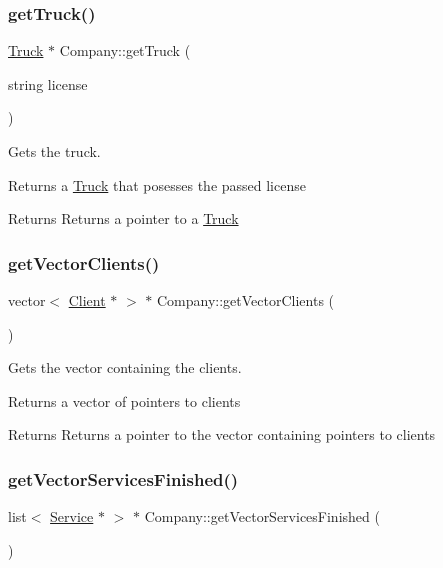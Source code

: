\subsubsection{\texorpdfstring{get\+Truck()}{getTruck()}}
{\footnotesize\ttfamily \hyperlink{class_truck}{Truck} $\ast$ Company\+::get\+Truck (\begin{DoxyParamCaption}\item[{string}]{license }\end{DoxyParamCaption})}



Gets the truck. 

Returns a \hyperlink{class_truck}{Truck} that posesses the passed license

\begin{DoxyReturn}{Returns}
Returns a pointer to a \hyperlink{class_truck}{Truck} 
\end{DoxyReturn}
\mbox{\label{class_company_a16693c2e4bf9a932e15926c37c21485f}} 
\subsubsection{\texorpdfstring{get\+Vector\+Clients()}{getVectorClients()}}
{\footnotesize\ttfamily vector$<$ \hyperlink{class_client}{Client} $\ast$ $>$ $\ast$ Company\+::get\+Vector\+Clients (\begin{DoxyParamCaption}{ }\end{DoxyParamCaption})}



Gets the vector containing the clients. 

Returns a vector of pointers to clients

\begin{DoxyReturn}{Returns}
Returns a pointer to the vector containing pointers to clients 
\end{DoxyReturn}
\mbox{\label{class_company_ab018a747472dbb17d07e85d17dc17912}} 
\subsubsection{\texorpdfstring{get\+Vector\+Services\+Finished()}{getVectorServicesFinished()}}
{\footnotesize\ttfamily list$<$ \hyperlink{class_service}{Service} $\ast$ $>$ $\ast$ Company\+::get\+Vector\+Services\+Finished (\begin{DoxyParamCaption}{ }\end{DoxyParamCaption})}



